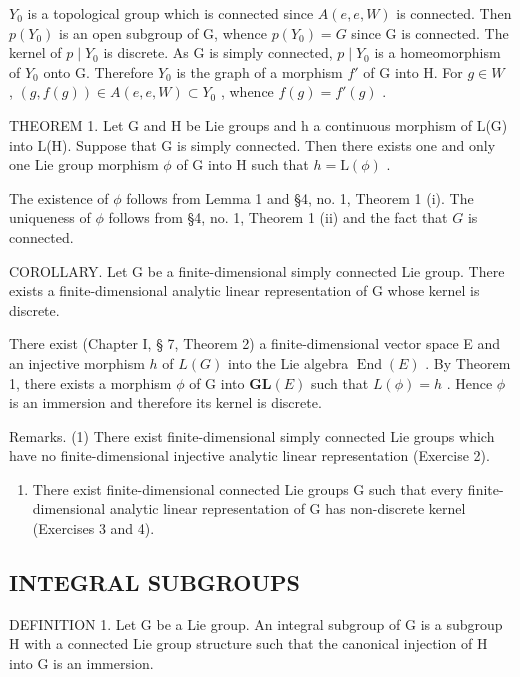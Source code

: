 \(Y_{0}\) is a topological group which is connected since \(A(e, e, W)\) is connected. Then \(p(Y_{0})\) is an open subgroup of G, whence \(p(Y_{0}) = G\) since G is connected. The kernel of \(p \mid Y_{0}\) is discrete. As G is simply connected, \(p \mid Y_{0}\) is a homeomorphism of \(Y_{0}\) onto G. Therefore \(Y_{0}\) is the graph of a morphism \(f'\) of G into H. For \(g \in W\) , \((g, f(g)) \in A(e, e, W) \subset Y_{0}\) , whence \(f(g) = f'(g)\) .

THEOREM 1. Let G and H be Lie groups and h a continuous morphism of L(G) into L(H). Suppose that G is simply connected. Then there exists one and only one Lie group morphism \(\phi\) of G into H such that \(h = \mathrm{L}(\phi)\) .

The existence of \(\phi\) follows from Lemma 1 and §4, no. 1, Theorem 1 (i). The uniqueness of \(\phi\) follows from §4, no. 1, Theorem 1 (ii) and the fact that \(G\) is connected.

COROLLARY. Let G be a finite-dimensional simply connected Lie group. There exists a finite-dimensional analytic linear representation of G whose kernel is discrete.

There exist (Chapter I, § 7, Theorem 2) a finite-dimensional vector space E and an injective morphism \(h\) of \(L(G)\) into the Lie algebra \(\operatorname{End}(E)\) . By Theorem 1, there exists a morphism \(\phi\) of G into \(\mathbf{GL}(E)\) such that \(L(\phi) = h\) . Hence \(\phi\) is an immersion and therefore its kernel is discrete.

Remarks. (1) There exist finite-dimensional simply connected Lie groups which have no finite-dimensional injective analytic linear representation (Exercise 2).

\begin{enumerate}
\def\labelenumi{(\arabic{enumi})}
\setcounter{enumi}{1}
\tightlist
\item
  There exist finite-dimensional connected Lie groups G such that every finite-dimensional analytic linear representation of G has non-discrete kernel (Exercises 3 and 4).
\end{enumerate}

\subsection{INTEGRAL SUBGROUPS}

DEFINITION 1. Let G be a Lie group. An integral subgroup of G is a subgroup H with a connected Lie group structure such that the canonical injection of H into G is an immersion.

